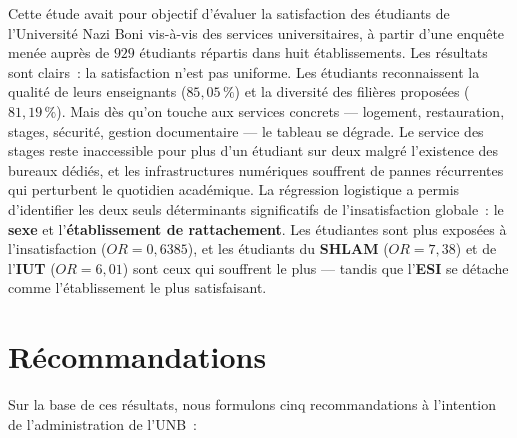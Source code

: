 \documentclass[
12pt,          %
a4paper,       %
oneside,      %
openright      %
]{report}          %
\begin{document}
	Cette \'etude avait pour objectif d'\'evaluer la
	satisfaction des \'etudiants de l'Universit\'e Nazi
	Boni vis-\`a-vis des services universitaires, \`a
	partir d'une enqu\^ete men\'ee aupr\`es de $929$
	\'etudiants r\'epartis dans huit \'etablissements.
	Les r\'esultats sont clairs~: la satisfaction n'est
	pas uniforme. Les \'etudiants reconnaissent la
	qualit\'e de leurs enseignants ($85{,}05\,\%$) et la
	diversit\'e des fili\`eres propos\'ees ($81{,}19\,\%$).
	Mais d\`es qu'on touche aux services concrets ---
	logement, restauration, stages, s\'ecurit\'e,
	gestion documentaire --- le tableau se d\'egrade.
	Le service des stages reste inaccessible pour plus
	d'un \'etudiant sur deux malgr\'e l'existence des
	bureaux d\'edi\'es, et les infrastructures
	num\'eriques souffrent de pannes r\'ecurrentes qui
	perturbent le quotidien acad\'emique.
	La r\'egression logistique a permis d'identifier
	les deux seuls d\'eterminants significatifs de
	l'insatisfaction globale~: le \textbf{sexe} et
	l'\textbf{\'etablissement de rattachement}. Les
	\'etudiantes sont plus expos\'ees \`a l'insatisfaction
	($OR = 0{,}6385$), et les \'etudiants du \textbf{SHLAM}
	($OR = 7{,}38$) et de l'\textbf{IUT} ($OR = 6{,}01$)
	sont ceux qui souffrent le plus --- tandis que
	l'\textbf{ESI} se d\'etache comme l'\'etablissement
	le plus satisfaisant.
	
	
	\section{Récommandations}
	Sur la base de ces r\'esultats, nous formulons
	cinq recommandations \`a l'intention de
	l'administration de l'UNB~:
	
\end{document}
